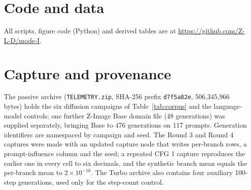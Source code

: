 \documentclass[11pt]{article}
\begin{document}
\section*{Code and data}
All scripts, figure code (Python) and derived tables are at \url{https://github.com/Z-L-D/mode-I}.




\appendix
\section{Capture and provenance}\label{app:provenance}
The passive archive (\texttt{TELEMETRY.zip}, SHA-256 prefix \texttt{d7f5a82e}, 506{,}345{,}966 bytes) holds the six diffusion campaigns of Table~\ref{tab:corpus} and the language-model controls; one further Z-Image Base domain file (48 generations) was supplied separately, bringing Base to 476 generations on 117 prompts. Generation identifiers are namespaced by campaign and seed. The Round 3 and Round 4 captures were made with an updated capture node that writes per-branch rows, a prompt-influence column and the seed; a repeated CFG 1 capture reproduces the earlier one in every cell to six decimals, and the synthetic branch mean equals the per-branch mean to $2\times10^{-16}$. The Turbo archive also contains four auxiliary 100-step generations, used only for the step-count control.
\end{document}
